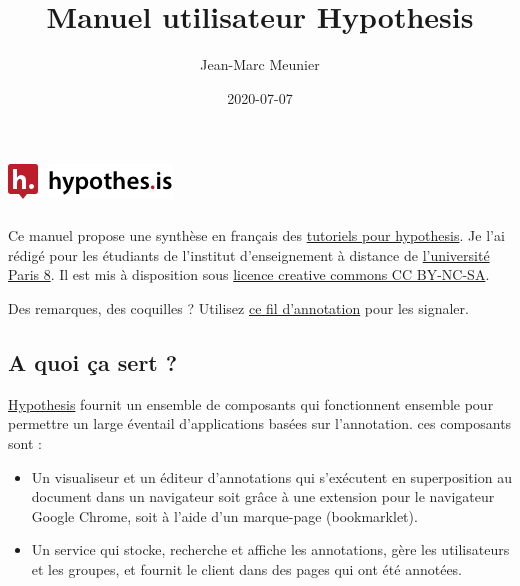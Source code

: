 \documentclass[
]{book}
\title{Manuel utilisateur Hypothesis}
\author{Jean-Marc Meunier}
\date{2020-07-07}
\providecommand{\tightlist}{%
  \setlength{\itemsep}{0pt}\setlength{\parskip}{0pt}}
\begin{document}
\frontmatter
\maketitle

{
\setcounter{tocdepth}{1}
\tableofcontents
}
\mainmatter
\hypertarget{section}{%
\chapter*{\texorpdfstring{\protect\includegraphics{img/hypothesislogomark.png}}{}}\label{section}}

Ce manuel propose une synthèse en français des \href{https://web.hypothes.is/help-categories/tutorials/}{tutoriels pour hypothesis}. Je l'ai rédigé pour les étudiants de l'institut d'enseignement à distance de \href{https://www.univ-paris8.fr/}{l'université Paris 8}. Il est mis à disposition sous \href{https://creativecommons.org/licenses/by-nc-sa/3.0/fr/}{licence creative commons CC BY-NC-SA}.

Des remarques, des coquilles ? Utilisez \href{https://hyp.is/go?url=https\%3A\%2F\%2Fjmeunierp8.github.io\%2FGuide-utilisateur-Hypothesis\%2F\&group=__world__}{ce fil d'annotation} pour les signaler.

\hypertarget{a-quoi-uxe7a-sert}{%
\section*{A quoi ça sert ?}\label{a-quoi-uxe7a-sert}}

\href{https://web.hypothes.is/}{Hypothesis} fournit un ensemble de composants qui fonctionnent ensemble pour permettre un large éventail d'applications basées sur l'annotation. ces composants sont :

\begin{itemize}
\tightlist
\item
  Un visualiseur et un éditeur d'annotations qui s'exécutent en superposition au document dans un navigateur soit grâce à une extension pour le navigateur Google Chrome, soit à l'aide d'un marque-page (bookmarklet).
\item
  Un service qui stocke, recherche et affiche les annotations, gère les utilisateurs et les groupes, et fournit le client dans des pages qui ont été annotées.
\end{itemize}
\end{document}
